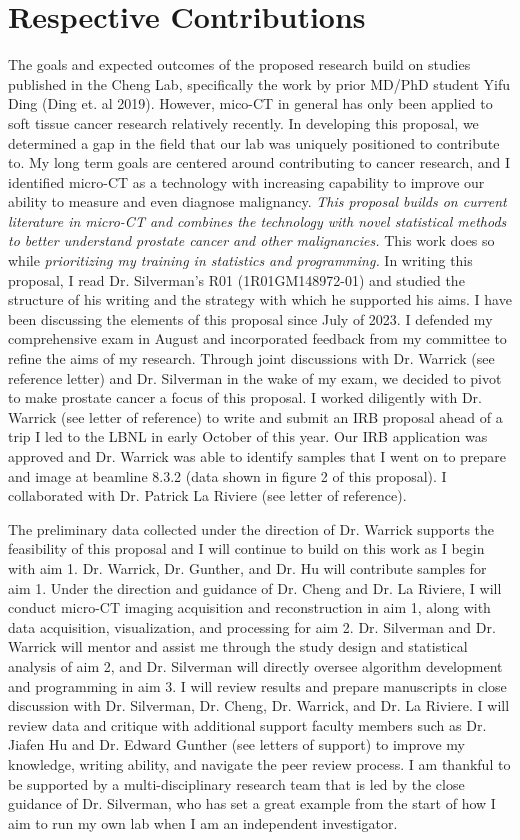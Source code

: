 \documentclass{NIHGrant}
\begin{document}
\part*{Respective Contributions}
The goals and expected outcomes of the proposed research build on studies published in the Cheng Lab, specifically the work by prior MD/PhD student Yifu Ding (Ding et. al 2019). However, mico-CT in general has only been applied to soft tissue cancer research relatively recently. In developing this proposal, we determined a gap in the field that our lab was uniquely positioned to contribute to. My long term goals are centered around contributing to cancer research, and I identified micro-CT as a technology with increasing capability to improve our ability to measure and even diagnose malignancy. \emph{This proposal builds on current literature in micro-CT and combines the technology with novel statistical methods to better understand prostate cancer and other malignancies.} This work does so while \emph{prioritizing my training in statistics and programming.} In writing this proposal, I read Dr. Silverman's R01 (1R01GM148972-01) and studied the structure of his writing and the strategy with which he supported his aims. I have been discussing the elements of this proposal since July of 2023. I defended my comprehensive exam in August and incorporated feedback from my committee to refine the aims of my research. Through joint discussions with Dr. Warrick (see reference letter) and Dr. Silverman in the wake of my exam, we decided to pivot to make prostate cancer a focus of this proposal. I worked diligently with Dr. Warrick (see letter of reference) to write and submit an IRB proposal ahead of a trip I led to the LBNL in early October of this year. Our IRB application was approved and Dr. Warrick was able to identify samples that I went on to prepare and image at beamline 8.3.2 (data shown in figure 2 of this proposal). I collaborated with Dr. Patrick La Riviere (see letter of reference).

The preliminary data collected under the direction of Dr. Warrick supports the feasibility of this proposal and I will continue to build on this work as I begin with aim 1. Dr. Warrick, Dr. Gunther, and Dr. Hu will contribute samples for aim 1. Under the direction and guidance of Dr. Cheng and Dr. La Riviere, I will conduct micro-CT imaging acquisition and reconstruction in aim 1, along with data acquisition, visualization, and processing for aim 2. Dr. Silverman and Dr. Warrick will mentor and assist me through the study design and statistical analysis of aim 2, and Dr. Silverman will directly oversee algorithm development and programming in aim 3. I will review results and prepare manuscripts in close discussion with Dr. Silverman, Dr. Cheng, Dr. Warrick, and Dr. La Riviere. I will review data and critique with additional support faculty members such as Dr. Jiafen Hu and Dr. Edward Gunther (see letters of support) to improve my knowledge, writing ability, and navigate the peer review process. I am thankful to be supported by a multi-disciplinary research team that is led by the close guidance of Dr. Silverman, who has set a great example from the start of how I aim to run my own lab when I am an independent investigator.

\end{document}

